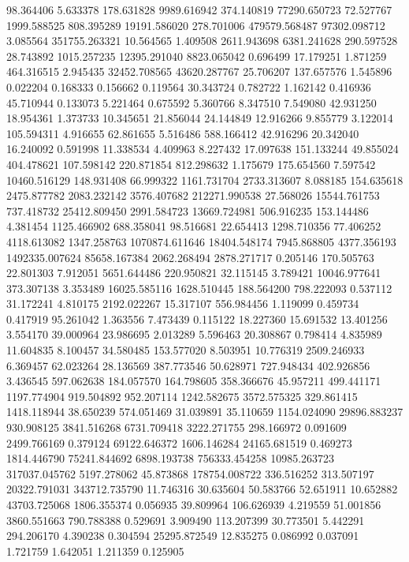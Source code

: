 98.364406
5.633378
178.631828
9989.616942
374.140819
77290.650723
72.527767
1999.588525
808.395289
19191.586020
278.701006
479579.568487
97302.098712
3.085564
351755.263321
10.564565
1.409508
2611.943698
6381.241628
290.597528
28.743892
1015.257235
12395.291040
8823.065042
0.696499
17.179251
1.871259
464.316515
2.945435
32452.708565
43620.287767
25.706207
137.657576
1.545896
0.022204
0.168333
0.156662
0.119564
30.343724
0.782722
1.162142
0.416936
45.710944
0.133073
5.221464
0.675592
5.360766
8.347510
7.549080
42.931250
18.954361
1.373733
10.345651
21.856044
24.144849
12.916266
9.855779
3.122014
105.594311
4.916655
62.861655
5.516486
588.166412
42.916296
20.342040
16.240092
0.591998
11.338534
4.409963
8.227432
17.097638
151.133244
49.855024
404.478621
107.598142
220.871854
812.298632
1.175679
175.654560
7.597542
10460.516129
148.931408
66.999322
1161.731704
2733.313607
8.088185
154.635618
2475.877782
2083.232142
3576.407682
212271.990538
27.568026
15544.761753
737.418732
25412.809450
2991.584723
13669.724981
506.916235
153.144486
4.381454
1125.466902
688.358041
98.516681
22.654413
1298.710356
77.406252
4118.613082
1347.258763
1070874.611646
18404.548174
7945.868805
4377.356193
1492335.007624
85658.167384
2062.268494
2878.271717
0.205146
170.505763
22.801303
7.912051
5651.644486
220.950821
32.115145
3.789421
10046.977641
373.307138
3.353489
16025.585116
1628.510445
188.564200
798.222093
0.537112
31.172241
4.810175
2192.022267
15.317107
556.984456
1.119099
0.459734
0.417919
95.261042
1.363556
7.473439
0.115122
18.227360
15.691532
13.401256
3.554170
39.000964
23.986695
2.013289
5.596463
20.308867
0.798414
4.835989
11.604835
8.100457
34.580485
153.577020
8.503951
10.776319
2509.246933
6.369457
62.023264
28.136569
387.773546
50.628971
727.948434
402.926856
3.436545
597.062638
184.057570
164.798605
358.366676
45.957211
499.441171
1197.774904
919.504892
952.207114
1242.582675
3572.575325
329.861415
1418.118944
38.650239
574.051469
31.039891
35.110659
1154.024090
29896.883237
930.908125
3841.516268
6731.709418
3222.271755
298.166972
0.091609
2499.766169
0.379124
69122.646372
1606.146284
24165.681519
0.469273
1814.446790
75241.844692
6898.193738
756333.454258
10985.263723
317037.045762
5197.278062
45.873868
178754.008722
336.516252
313.507197
20322.791031
343712.735790
11.746316
30.635604
50.583766
52.651911
10.652882
43703.725068
1806.355374
0.056935
39.809964
106.626939
4.219559
51.001856
3860.551663
790.788388
0.529691
3.909490
113.207399
30.773501
5.442291
294.206170
4.390238
0.304594
25295.872549
12.835275
0.086992
0.037091
1.721759
1.642051
1.211359
0.125905
